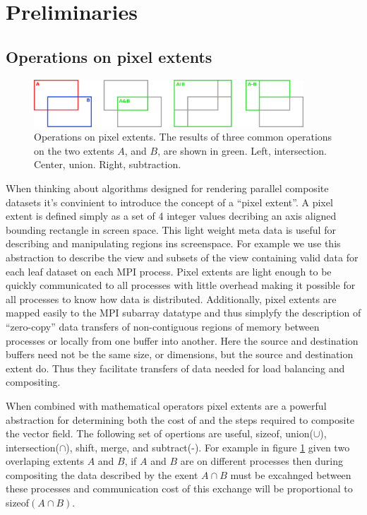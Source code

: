 \documentclass[a4paper,10pt]{article}
\begin{document}
\section{Preliminaries}
\subsection{Operations on pixel extents}
\begin{figure}[h]
 \centering
 \includegraphics[width=0.9\textwidth]{./images-data/operations.png}
 \caption{Operations on pixel extents. The results of three common operations on the two extents $A$, and $B$, are shown in green. Left, intersection. Center, union. Right, subtraction.}
 \label{fig:pixel-ops}
\end{figure}

When thinking about algorithms designed for rendering parallel composite datasets it's convinient to introduce the concept of a ``pixel extent''. A pixel extent is defined simply as a set of 4 integer values decribing an axis aligned bounding rectangle in screen space. This light weight meta data is useful for describing and manipulating regions ins screenspace. For example we use this abstraction to describe the view and subsets of the view containing valid data for each leaf dataset on each MPI process. Pixel extents are light enough to be quickly communicated to all processes with little overhead making it possible for all processes to know how data is distributed. Additionally, pixel extents are mapped easily to the MPI subarray datatype and thus simplyfy the description of ``zero-copy'' data transfers of non-contiguous regions of memory between processes or locally from one buffer into another. Here the source and destination buffers need not be the same size, or dimensions, but the source and destination extent do. Thus they facilitate transfers of data needed for load balancing and compositing. 

When combined with mathematical operators pixel extents are a powerful abstraction for determining both the cost of and the steps required to composite the vector field. The following set of opertions are useful, sizeof, union($\cup$), intersection($\cap$), shift, merge, and subtract(-). For example in figure \ref{fig:pixel-ops} given two overlaping extents $A$ and $B$, if $A$ and $B$ are on different processes then during compositing the data described by the exent $A \cap B$ must be excahnged between these processes and communication cost of this exchange will be proportional to sizeof$(A \cap B)$.
\end{document}
